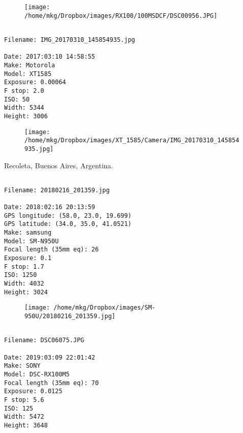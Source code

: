 \begin{figure}
\texttt{[image: /home/mkg/Dropbox/images/RX100/100MSDCF/DSC00956.JPG]}
\end{figure}
    
\clearpage
\onecolumn
\noindent 
\noindent
\begin{lstlisting}

Filename: IMG_20170310_145854935.jpg

Date: 2017:03:10 14:58:55
Make: Motorola
Model: XT1585
Exposure: 0.00064
F stop: 2.0
ISO: 50
Width: 5344
Height: 3006
\end{lstlisting}
\clearpage

\begin{figure}
\texttt{[image: /home/mkg/Dropbox/images/XT\_1585/Camera/IMG\_20170310\_145854935.jpg]}
\end{figure}
    
\clearpage
\onecolumn
\noindent Recoleta, Buenos Aires, Argentina.
\noindent
\begin{lstlisting}

Filename: 20180216_201359.jpg

Date: 2018:02:16 20:13:59
GPS longitude: (58.0, 23.0, 19.699)
GPS latitude: (34.0, 35.0, 41.0521)
Make: samsung
Model: SM-N950U
Focal length (35mm eq): 26
Exposure: 0.1
F stop: 1.7
ISO: 1250
Width: 4032
Height: 3024
\end{lstlisting}
\clearpage

\begin{figure}
\texttt{[image: /home/mkg/Dropbox/images/SM-950U/20180216\_201359.jpg]}
\end{figure}
    
\clearpage
\onecolumn
\noindent 
\noindent
\begin{lstlisting}

Filename: DSC06075.JPG

Date: 2019:03:09 22:01:42
Make: SONY
Model: DSC-RX100M5
Focal length (35mm eq): 70
Exposure: 0.0125
F stop: 5.6
ISO: 125
Width: 5472
Height: 3648
\end{lstlisting}
\clearpage


